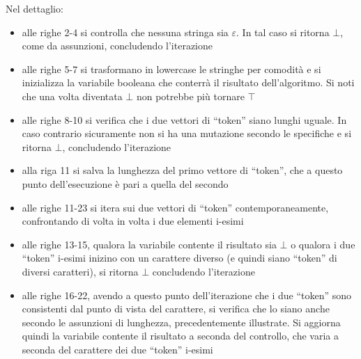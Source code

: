 \documentclass[a4paper,12pt, oneside]{book}
\begin{document}
\newpage
Nel dettaglio:
\begin{itemize}
  \item alle righe 2-4 si controlla che nessuna stringa sia $\varepsilon$. In
  tal caso si ritorna $\bot$, come da assunzioni, concludendo l'iterazione
  \item alle righe 5-7 si trasformano in lowercase le stringhe per comodità e si
  inizializza la variabile booleana che conterrà il risultato dell'algoritmo. Si
  noti che una volta diventata $\bot$ non potrebbe più tornare $\top$
  \item alle righe 8-10 si verifica che i due vettori di ``token'' siano lunghi
  uguale. In caso contrario sicuramente non si ha una mutazione secondo le
  specifiche e si ritorna $\bot$, concludendo l'iterazione
  \item alla riga 11 si salva la lunghezza del primo vettore di ``token'', che a
  questo punto dell'esecuzione è pari a quella del secondo
  \item alle righe 11-23 si itera sui due vettori di ``token''
  contemporaneamente, confrontando di volta in volta i due elementi i-esimi
  \item alle righe 13-15, qualora la variabile contente il risultato sia
  $\bot$ o qualora i due ``token'' i-esimi inizino con un carattere diverso (e
  quindi siano ``token'' di diversi caratteri), si ritorna $\bot$ concludendo
  l'iterazione
  \item alle righe 16-22, avendo a questo punto dell'iterazione che i due
  ``token'' sono consistenti dal punto di vista del carattere, si verifica che
  lo siano anche secondo le assunzioni di lunghezza, precedentemente illustrate.
  Si aggiorna quindi la variabile contente il risultato a seconda del controllo,
  che varia a seconda del carattere dei due ``token'' i-esimi
\end{itemize}
\end{document}
